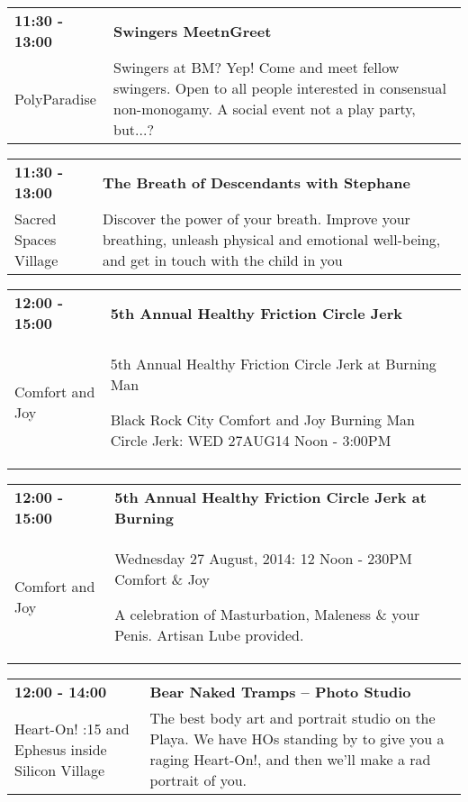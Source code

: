 \begin{tabular}{ p{1in} p{2.2in} }
    \textbf{11:30 - 13:00} & \textbf{Swingers MeetnGreet} \\
    PolyParadise \newline  & Swingers at BM? Yep! Come and meet fellow swingers. Open to all people interested in consensual non-monogamy. A social event not a play party, but...? \\
    \hline 
\end{tabular}
    
\begin{tabular}{ p{1in} p{2.2in} }
    \textbf{11:30 - 13:00} & \textbf{The Breath of Descendants with Stephane} \\
    Sacred Spaces Village \newline  & Discover the power of your breath. Improve your breathing, unleash physical and emotional well-being, and get in touch with the child in you \\
    \hline 
\end{tabular}
    
\begin{tabular}{ p{1in} p{2.2in} }
    \textbf{12:00 - 15:00} & \textbf{5th Annual Healthy Friction Circle Jerk} \\
    Comfort and Joy \newline  & 5th Annual Healthy Friction Circle Jerk
at Burning Man

Black Rock City
Comfort and Joy
Burning Man Circle Jerk: WED 27AUG14
Noon - 3:00PM \\
    \hline 
\end{tabular}
    
\begin{tabular}{ p{1in} p{2.2in} }
    \textbf{12:00 - 15:00} & \textbf{5th Annual Healthy Friction Circle Jerk at Burning} \\
    Comfort and Joy \newline  & Wednesday 27 August, 2014: 
12 Noon - 230PM 
Comfort \& Joy

 
A celebration of Masturbation, Maleness \& your Penis. Artisan Lube provided. \\
    \hline 
\end{tabular}
    
\begin{tabular}{ p{1in} p{2.2in} }
    \textbf{12:00 - 14:00} & \textbf{Bear Naked Tramps -- Photo Studio} \\
    Heart-On! \newline 6:15 and Ephesus inside Silicon Village & The best body art and portrait studio on the Playa. We have HOs standing by to give you a raging Heart-On!, and then we'll make a rad portrait of you. \\
    \hline 
\end{tabular}
    
